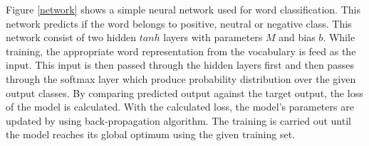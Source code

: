 \documentclass[12pt]{report} %
\begin{document}
Figure \ref{network} shows a simple neural network used for word classification. This network predicts if the word belongs to positive, neutral or negative class. This network consist of two hidden $tanh$ layers with parameters $M$ and bias $b$. While training, the appropriate word representation from the vocabulary is feed as the input. This input is then passed through the hidden layers first and then passes through the softmax layer which produce probability distribution over the given output classes. By comparing predicted output against the target output, the loss of the model is calculated. With the calculated loss, the model's parameters are updated by using back-propagation algorithm. The training is carried out until the model reaches its global optimum using the given training set.
% 
%
%
%
%
%
%
%
%
\end{document}
